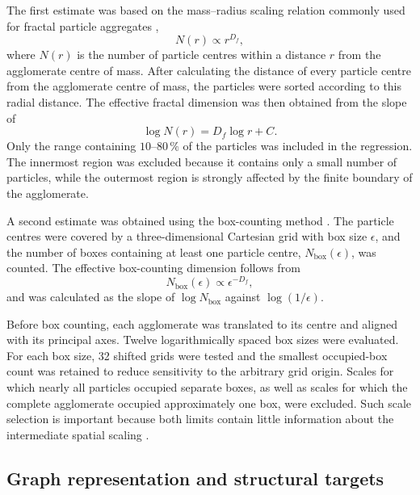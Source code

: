 \documentclass[12pt,a4paper]{article}
\begin{document}
The first estimate was based on the mass--radius scaling relation commonly
used for fractal particle aggregates \cite{Sorensen2001,Bushell2002},
\begin{equation}
	N(r)\propto r^{D_f},
\end{equation}
where \(N(r)\) is the number of particle centres within a distance \(r\) from
the agglomerate centre of mass. After calculating the distance of every
particle centre from the agglomerate centre of mass, the particles were sorted
according to this radial distance. The effective fractal dimension was then
obtained from the slope of
\begin{equation}
	\log N(r)=D_f\log r+C.
\end{equation}
Only the range containing \(10\)--\(80\,\%\) of the particles was included in
the regression. The innermost region was excluded because it contains only a
small number of particles, while the outermost region is strongly affected by
the finite boundary of the agglomerate.

A second estimate was obtained using the box-counting method
\cite{Liebovitch1989,ForoutanPour1999,Theiler1990}. The particle centres were
covered by a three-dimensional Cartesian grid with box size \(\epsilon\), and
the number of boxes containing at least one particle centre,
\(N_{\mathrm{box}}(\epsilon)\), was counted. The effective box-counting
dimension follows from
\begin{equation}
	N_{\mathrm{box}}(\epsilon)
	\propto \epsilon^{-D_f},
\end{equation}
and was calculated as the slope of
\(\log N_{\mathrm{box}}\) against \(\log(1/\epsilon)\).

Before box counting, each agglomerate was translated to its centre and aligned
with its principal axes. Twelve logarithmically spaced box sizes were
evaluated. For each box size, 32 shifted grids were tested and the smallest
occupied-box count was retained to reduce sensitivity to the arbitrary grid
origin. Scales for which nearly all particles occupied separate boxes, as well
as scales for which the complete agglomerate occupied approximately one box,
were excluded. Such scale selection is important because both limits contain
little information about the intermediate spatial scaling
\cite{ForoutanPour1999,Theiler1990}.

\subsection{Graph representation and structural targets}
\end{document}
